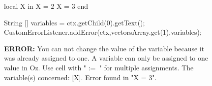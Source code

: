 \documentclass[11pt,a4paper,twoside,openright]{report}
\begin{document}
\begin{figure}[!ht]
 \begin{center}
 \begin{OZ}
    local X in
      X = 2
      X = 3
    end
\end{OZ}

\begin{JAVA}
    String [] variables = {ctx.getChild(0).getText()};
    CustomErrorListener.addError(ctx,vectorsArray.get(1),variables);
\end{JAVA}
  \end{center}

\textbf{ERROR:} You can not change the value of the variable because it was already assigned to one. A variable can only be assigned to one value in Oz. Use cell with " :=\ " for multiple assignments. The variable(s) concerned: [X]. Error found in "X = 3".

 \label{fig:adderror_exe}
\end{figure}

\newpage
\end{document}
